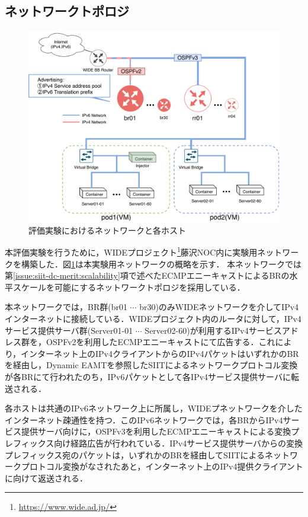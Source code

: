 \subsection{ネットワークトポロジ}
\begin{figure}[H]
    \begin{center}
    \includegraphics[width=15cm,pagebox=cropbox,clip]{img/evaluation_experiment.pdf}
    \end{center}
    \caption{評価実験におけるネットワークと各ホスト}
    \label{fig:evaluation_experiment}
\end{figure}

本評価実験を行うために，WIDEプロジェクト\footnote{\url{https://www.wide.ad.jp/}}藤沢NOC内に実験用ネットワークを構築した．図\ref{fig:evaluation_experiment}は本実験用ネットワークの概略を示す．
本ネットワークでは第\ref{issue:siit-dc-merit:scalability}項で述べたECMPエニーキャストによるBRの水平スケールを可能にするネットワークトポロジを採用している．


本ネットワークでは，BR群(br01 $\cdots$ br30)のみWIDEネットワークを介してIPv4インターネットに接続している．WIDEプロジェクト内のルータに対して，IPv4サービス提供サーバ群(Server01-01  $\cdots$ Server02-60)が利用するIPv4サービスアドレス群を，OSPFv2\cite{RFC2328}を利用したECMPエニーキャストにて広告する．これにより，インターネット上のIPv4クライアントからのIPv4パケットはいずれかのBRを経由し，Dynamic EAMTを参照したSIITによるネットワークプロトコル変換が各BRにて行われたのち，IPv6パケットとして各IPv4サービス提供サーバに転送される．

各ホストは共通のIPv6ネットワーク上に所属し，WIDEプネットワークを介したインターネット疎通性を持つ．このIPv6ネットワークでは，各BRからIPv4サービス提供サーバ向けに，OSPFv3\cite{RFC5340}を利用したECMPエニーキャストによる変換プレフィックス向け経路広告が行われている．IPv4サービス提供サーバからの変換プレフィックス宛のパケットは，いずれかのBRを経由してSIITによるネットワークプロトコル変換がなされたあと，インターネット上のIPv4提供クライアントに向けて返送される．

